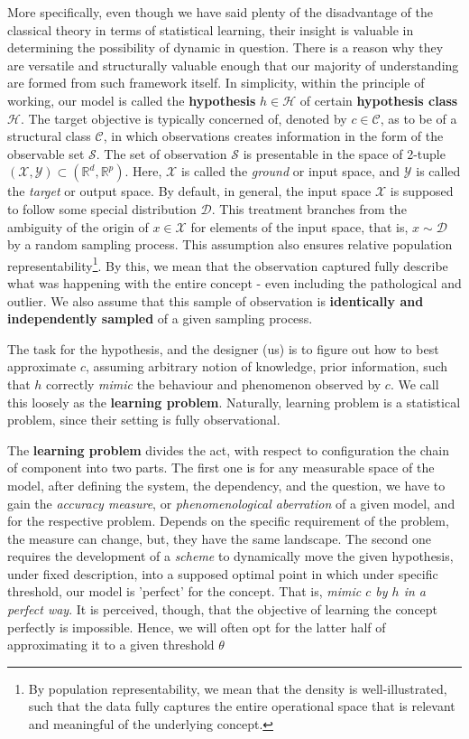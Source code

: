 More specifically, even though we have said plenty of the disadvantage of the classical theory in terms of statistical learning, their insight is valuable in determining the possibility of dynamic in question. There is a reason why they are versatile and structurally valuable enough that our majority of understanding are formed from such framework itself. In simplicity, within the principle of working, our model is called the \textbf{hypothesis} $h\in \mathcal{H}$ of certain \textbf{hypothesis class} $\mathcal{H}$. The target objective is typically concerned of, denoted by $c\in\mathcal{C}$, as to be of a structural class $\mathcal{C}$, in which observations creates information in the form of the observable set $\mathcal{S}$. The set of observation $\mathcal{S}$ is presentable in the space of 2-tuple $(\mathcal{X},\mathcal{Y})\subset(\mathbb{R}^{d},\mathbb{R}^{p})$. Here, $\mathcal{X}$ is called the \textit{ground} or input space, and $\mathcal{Y}$ is called the \textit{target} or output space. By default, in general, the input space $\mathcal{X}$ is supposed to follow some special distribution $\mathcal{D}$. This treatment branches from the ambiguity of the origin of $x\in\mathcal{X}$ for elements of the input space, that is, $x\sim \mathcal{D}$ by a random sampling process. This assumption also ensures relative population representability\footnote{By population representability, we mean that the density is well-illustrated, such that the data fully captures the entire operational space that is relevant and meaningful of the underlying concept.}. By this, we mean that the observation captured fully describe what was happening with the entire concept - even including the pathological and outlier. We also assume that this sample of observation is \textbf{identically and independently sampled} of a given sampling process. 

The task for the hypothesis, and the designer (us) is to figure out how to best approximate $c$, assuming arbitrary notion of knowledge, prior information, such that $h$ correctly \textit{mimic} the behaviour and phenomenon observed by $c$. We call this loosely as the \textbf{learning problem}. Naturally, learning problem is a statistical problem, since their setting is fully observational. 

The \textbf{learning problem} divides the act, with respect to configuration the chain of component into two parts. The first one is for any measurable space of the model, after defining the system, the dependency, and the question, we have to gain the \textit{accuracy measure}, or \textit{phenomenological aberration} of a given model, and for the respective problem. Depends on the specific requirement of the problem, the measure can change, but, they have the same landscape. The second one requires the development of a \textit{scheme} to dynamically move the given hypothesis, under fixed description, into a supposed optimal point in which under specific threshold, our model is 'perfect' for the concept. That is, \textit{mimic $c$ by $h$ in a perfect way}. It is perceived, though, that the objective of learning the concept perfectly is impossible. Hence, we will often opt for the latter half of approximating it to a given threshold $\theta$

